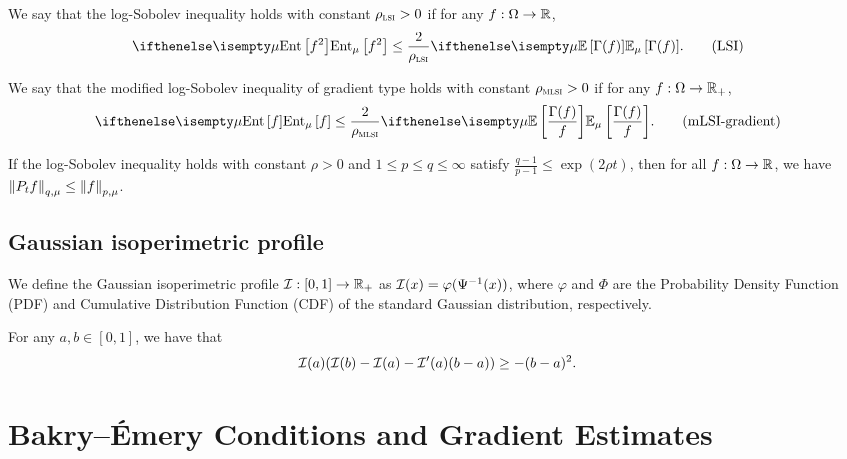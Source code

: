 \begin{definition}
    We say that the log-Sobolev inequality holds with constant $\rho_{{\normalfont\textsc{lsi}}} > 0$ if for any $f: \Omega \to \mathbb{R}$,
    \begin{align}\label{eq:LSI}
        \Ent[\mu]{f^2} \leq \frac 2{\rho_{\LSI}} \E[\mu]{\Gamma (f)}. \tag{LSI}
    \end{align}
\end{definition}

\begin{definition}
    We say that the modified log-Sobolev inequality of gradient type holds with constant $\rho_{{\normalfont\textsc{mlsi}}} > 0$ if for any $f: \Omega \to \mathbb{R}_+$,
    \begin{align}\label{eq:mLSI-gradient}
        \Ent[\mu]{f} \leq \frac 2{\rho_{\MLSI}} \E[\mu]{\frac{\Gamma (f)}{f}}. \tag{mLSI-gradient}
    \end{align}
\end{definition}

\begin{theorem}[Hypercontractivity]\label{thm:hypercontractivity}
    If the log-Sobolev inequality holds with constant $\rho > 0$ and $1\leq p \leq q \leq \infty$ satisfy $\frac{q-1}{p-1}\leq \exp(2\rho t)$, then for all $f: \Omega \to \mathbb{R}$, we have $\left\lVert P_t f \right\rVert_{q,\mu} \leq \left\lVert f \right\rVert_{p,\mu}$.
\end{theorem}

\subsection{Gaussian isoperimetric profile}
\begin{definition}\label{def:gaussian_isoperimetric_profile}
    We define the Gaussian isoperimetric profile $\mathcal{I}: [0,1] \to \mathbb{R}_+$ as $\mathcal{I}(x) = \varphi(\Psi^{-1}(x))$, where $\varphi$ and $\Phi$ are the Probability Density Function (PDF) and Cumulative Distribution Function (CDF) of the standard Gaussian distribution, respectively.
\end{definition}
\begin{fact}\label{fact:gaussian_isoperimetric_profile_ineq}
    For any $a,b\in [0,1]$, we have that
    $$
        \mathcal{I}(a)(\mathcal{I}(b)-\mathcal{I}(a)-\mathcal{I}'(a)(b-a))\geq -(b-a)^2 .
    $$
\end{fact}

\section{Bakry--\'Emery Conditions and Gradient Estimates}

